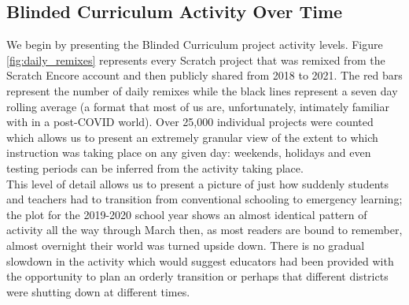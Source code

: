 \documentclass[sigconf,manuscript,review,anonymous]{acmart} %
\newcommand{\Scratchencore}[0]{Blinded Curriculum}
\begin{document}
\subsection{\Scratchencore{} Activity Over Time}
We begin by presenting the \Scratchencore{} project activity levels. Figure \ref{fig:daily_remixes}
 represents every Scratch project that was remixed from the Scratch Encore account and 
 then publicly shared from 2018 to 2021. The red bars represent the number of daily remixes 
 while the black lines represent a seven day rolling average (a format that most of us are, 
 unfortunately, intimately familiar with in a post-COVID world). Over 25,000 individual 
 projects were counted which allows us to present an extremely granular view of the extent 
 to which instruction was taking place on any given day: weekends, holidays and even 
 testing periods can be inferred from the activity taking place.\\
This level of detail allows us to present a picture of just how suddenly students and teachers
 had to transition from conventional schooling to emergency learning; the plot for the 
 2019-2020 school year shows an almost identical pattern of activity all the way through 
 March then, as most readers are bound to remember, almost overnight their world was 
 turned upside down. There is no gradual slowdown in the activity which would suggest 
 educators had been provided with the opportunity to plan an orderly transition or perhaps 
 that different districts were shutting down at different times.
\end{document}
